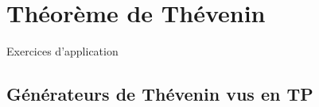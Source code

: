 \documentclass[../main/main.tex]{subfiles}
\begin{document}
\chapter{Théorème de Thévenin}\label{ch:O3}
\vspace*{-47pt}

\begin{center}
    \Huge Exercices d'application
\end{center}

\section{Générateurs de Thévenin vus en TP}
\end{document}
